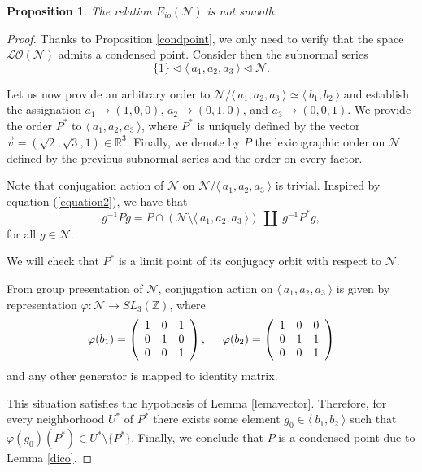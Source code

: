 \documentclass[12pt]{article}
\newtheorem{prop}{Proposition}
\theoremstyle{definition}
\begin{document}
\begin{prop}
\label{newgroup}
    The relation $E_{io}(\mathcal{N})$ is not smooth.
\end{prop}
\begin{proof}
    Thanks to Proposition \ref{condpoint}, we only need to verify that the space $\mathcal{LO}(\mathcal{N})$ admits a condensed point. 
Consider then the subnormal series 
$$\{1\}\vartriangleleft\langle\ a_1,a_2,a_3\ \rangle \vartriangleleft \mathcal{N}.$$

Let us now provide an arbitrary order to $\mathcal{N}/\langle\ a_1,a_2,a_3\ \rangle\simeq \langle\ b_1,b_2\ \rangle$ and establish the assignation $a_1\rightarrow (1,0,0)$, $a_2\rightarrow (0,1,0)$, and $a_3\rightarrow (0,0,1)$. We provide the order $P^*$ to $\langle\ a_1,a_2,a_3\ \rangle$, where $P^*$ is uniquely defined by the vector $\vec{v}=(\sqrt{2},\sqrt{3},1) \in \mathbb{R}^3$. Finally, we denote by $P$ the lexicographic order on $\mathcal{N}$ defined by the previous subnormal series and the order on every factor. %

Note that conjugation action of $\mathcal{N}$ on $\mathcal{N}/\langle\ a_1,a_2,a_3\ \rangle$ is trivial. Inspired by equation (\ref{equation2}), we have that
\begin{equation}
\label{clever}
    g^{-1}Pg=P\cap (\mathcal{N}\setminus \langle\ a_1,a_2,a_3\ \rangle)\ \amalg\ g^{-1}P^*g,
\end{equation}
for all $g\in \mathcal{N}$. 

We will check that $P^*$ is a limit point of its conjugacy orbit with respect to $\mathcal{N}$. 

From group presentation of $\mathcal{N}$, conjugation action on $\langle\ a_1,a_2,a_3\ \rangle$ is given by representation $\varphi:\mathcal{N}\rightarrow SL_3(\mathbb{Z})$, where
$$\varphi(b_1)=
\left ( \begin{array}{ccc}
1 & 0 & 1\\
0 & 1 & 0\\
0 & 0 & 1
\end{array}
\right ),\hspace{0.5cm} 
\varphi(b_2)= 
\left ( \begin{array}{ccc}
1 & 0 & 0\\
0 & 1 & 1\\
0 & 0 & 1
\end{array}
\right )$$
and any other generator is mapped to identity matrix.

This situation satisfies the hypothesis of Lemma \ref{lemavector}. Therefore, for every neighborhood $U^*$ of $P^*$ there exists some element $g_0\in \langle\ b_1,b_2\ \rangle$ such that $\varphi(g_0)(P^*)\in U^*\setminus\{P^*\}$. Finally, we conclude that $P$ is a condensed point due to Lemma \ref{dico}.
\end{proof}
\end{document}
